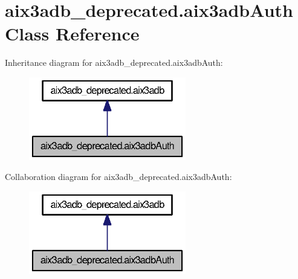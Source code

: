 \section{aix3adb\-\_\-deprecated.\-aix3adb\-Auth Class Reference}
\label{classaix3adb__deprecated_1_1aix3adbAuth}


Inheritance diagram for aix3adb\-\_\-deprecated.\-aix3adb\-Auth\-:
\nopagebreak
\begin{figure}[H]
\begin{center}
\leavevmode
\includegraphics[width=194pt]{classaix3adb__deprecated_1_1aix3adbAuth__inherit__graph}
\end{center}
\end{figure}


Collaboration diagram for aix3adb\-\_\-deprecated.\-aix3adb\-Auth\-:
\nopagebreak
\begin{figure}[H]
\begin{center}
\leavevmode
\includegraphics[width=194pt]{classaix3adb__deprecated_1_1aix3adbAuth__coll__graph}
\end{center}
\end{figure}
